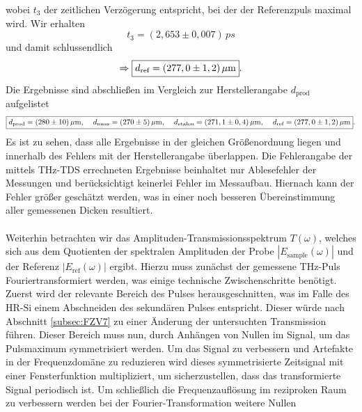 wobei $t_{3}$ der zeitlichen Verzögerung entspricht, bei der der Referenzpuls maximal wird. 
Wir erhalten
\begin{equation}
    t_{3} = (2,653 \pm 0,007)\,\si{ps}
\end{equation}
und damit schlussendlich 
\begin{equation}
    \Rightarrow\fbox{$d_{\text{ref}} = (277,0 \pm 1,2)\,\si{\mu m}$}.
\end{equation}
Die Ergebnisse sind abschließen im Vergleich zur Herstellerangabe $d_{\text{prod}}$ aufgelistet
\begin{equation*}
    \fbox{$d_{\text{prod}} = (280 \pm 10)\,\si{\mu m},\hspace{0.4cm}
    d_{\text{mess}} = (270 \pm 5)\,\si{\mu m},\hspace{0.4cm}
    d_{\text{etalon}} = (271,1 \pm 0,4)\,\si{\mu m},\hspace{0.4cm}
    d_{\text{ref}} = (277,0 \pm 1,2)\,\si{\mu m}$}.
\end{equation*} 
Es ist zu sehen, dass alle Ergebnisse in der gleichen Größenordnung liegen und innerhalb des Fehlers
mit der Herstellerangabe überlappen. Die Fehlerangabe der mittels THz-TDS errechneten Ergebnisse 
beinhaltet nur Ablesefehler der Messungen und berücksichtigt keinerlei Fehler im 
Messaufbau. Hiernach kann der Fehler größer geschätzt werden, was in einer noch besseren 
Übereinstimmung aller gemessenen Dicken resultiert. \\ \\
Weiterhin betrachten wir das Amplituden-Transmissionsspektrum $T(\omega)$, welches sich aus 
dem Quotienten der spektralen Amplituden der Probe $\left\vert E_{\text{sample}}(\omega) \right\vert$
und der Referenz $\left\vert E_{\text{ref}}(\omega) \right\vert$ ergibt. 
Hierzu muss zunächst der gemessene THz-Puls Fouriertransformiert werden, was einige technische 
Zwischenschritte benötigt. 
Zuerst wird der relevante Bereich des Pulses herausgeschnitten, was im Falle des HR-Si einem Abschneiden 
des sekundären Pulses entspricht. Dieser würde nach Abschnitt \ref{subsec:FZV7} zu einer Änderung der
untersuchten Transmission führen. Dieser Bereich muss nun, durch Anhängen von Nullen im Signal, 
um das Pulsmaximum symmetrisiert werden. Um das Signal zu verbessern und Artefakte in der Frequenzdomäne 
zu reduzieren wird dieses symmetrisierte Zeitsignal mit einer Fensterfunktion multipliziert, um sicherzustellen, 
dass das transformierte Signal periodisch ist. Um schließlich die Frequenzauflösung im reziproken Raum 
zu verbessern werden bei der Fourier-Transformation weitere Nullen 
